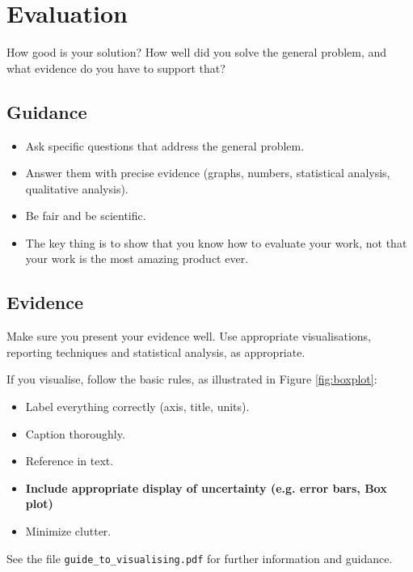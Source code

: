 \documentclass{l4proj}
\begin{document}
\chapter{Evaluation}
\label{chap:evaluation}

How good is your solution? How well did you solve the general problem, and what evidence do you have to support that?

\section{Guidance}
\begin{itemize}
    \item
        Ask specific questions that address the general problem.
    \item
        Answer them with precise evidence (graphs, numbers, statistical
        analysis, qualitative analysis).
    \item
        Be fair and be scientific.
    \item
        The key thing is to show that you know how to evaluate your work, not
        that your work is the most amazing product ever.
\end{itemize}

\section{Evidence}
Make sure you present your evidence well. Use appropriate visualisations, reporting techniques and statistical analysis, as appropriate.

If you visualise, follow the basic rules, as illustrated in Figure \ref{fig:boxplot}:
\begin{itemize}
\item Label everything correctly (axis, title, units).
\item Caption thoroughly.
\item Reference in text.
\item \textbf{Include appropriate display of uncertainty (e.g. error bars, Box plot)}
\item Minimize clutter.
\end{itemize}

See the file \texttt{guide\_to\_visualising.pdf} for further information and guidance.
\end{document}
